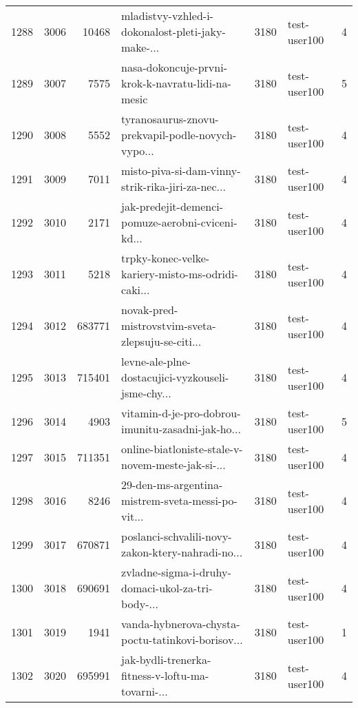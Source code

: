 \begin{tabular}{lrrlrlr}
1288 &       3006 &    10468 &  mladistvy-vzhled-i-dokonalost-pleti-jaky-make-... &     3180 &                 test-user100 &               4 \\
1289 &       3007 &     7575 &  nasa-dokoncuje-prvni-krok-k-navratu-lidi-na-mesic &     3180 &                 test-user100 &               5 \\
1290 &       3008 &     5552 &  tyranosaurus-znovu-prekvapil-podle-novych-vypo... &     3180 &                 test-user100 &               4 \\
1291 &       3009 &     7011 &  misto-piva-si-dam-vinny-strik-rika-jiri-za-nec... &     3180 &                 test-user100 &               4 \\
1292 &       3010 &     2171 &  jak-predejit-demenci-pomuze-aerobni-cviceni-kd... &     3180 &                 test-user100 &               4 \\
1293 &       3011 &     5218 &  trpky-konec-velke-kariery-misto-ms-odridi-caki... &     3180 &                 test-user100 &               4 \\
1294 &       3012 &   683771 &  novak-pred-mistrovstvim-sveta-zlepsuju-se-citi... &     3180 &                 test-user100 &               4 \\
1295 &       3013 &   715401 &  levne-ale-plne-dostacujici-vyzkouseli-jsme-chy... &     3180 &                 test-user100 &               4 \\
1296 &       3014 &     4903 &  vitamin-d-je-pro-dobrou-imunitu-zasadni-jak-ho... &     3180 &                 test-user100 &               5 \\
1297 &       3015 &   711351 &  online-biatloniste-stale-v-novem-meste-jak-si-... &     3180 &                 test-user100 &               4 \\
1298 &       3016 &     8246 &  29-den-ms-argentina-mistrem-sveta-messi-po-vit... &     3180 &                 test-user100 &               4 \\
1299 &       3017 &   670871 &  poslanci-schvalili-novy-zakon-ktery-nahradi-no... &     3180 &                 test-user100 &               4 \\
1300 &       3018 &   690691 &  zvladne-sigma-i-druhy-domaci-ukol-za-tri-body-... &     3180 &                 test-user100 &               4 \\
1301 &       3019 &     1941 &  vanda-hybnerova-chysta-poctu-tatinkovi-borisov... &     3180 &                 test-user100 &               1 \\
1302 &       3020 &   695991 &  jak-bydli-trenerka-fitness-v-loftu-ma-tovarni-... &     3180 &                 test-user100 &               4 \\

\end{tabular}
